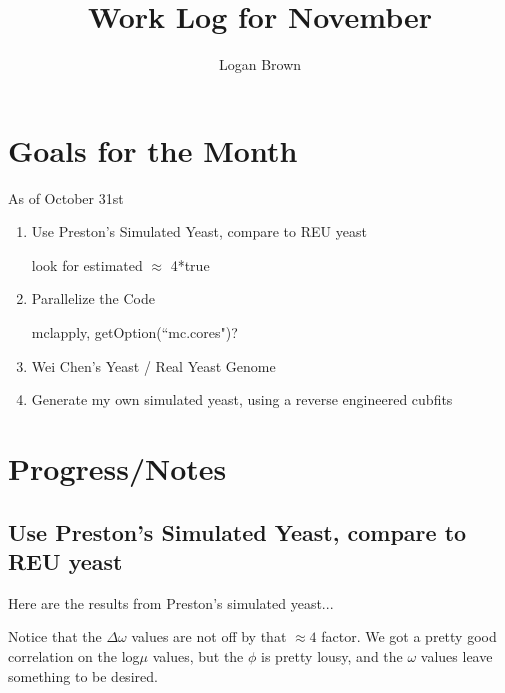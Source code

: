 

\title{Work Log for November}
\author{Logan Brown}


\maketitle
\tableofcontents

\newpage


\section{Goals for the Month}
As of October 31st
\begin{enumerate}
\item Use Preston's Simulated Yeast, compare to REU yeast

look for estimated $\approx$ 4*true
\item Parallelize the Code

mclapply, getOption(``mc.cores")?
\item Wei Chen's Yeast / Real Yeast Genome
\item Generate my own simulated yeast, using a reverse engineered cubfits
\end{enumerate}

\section{Progress/Notes}

\subsection{Use Preston's Simulated Yeast, compare to REU yeast}

Here are the results from Preston's simulated yeast...

Notice that the $\Delta\omega$ values are not off by that $\approx4$ factor. We got a pretty good correlation on the log$\mu$ values, but the $\phi$ is pretty lousy, and the $\omega$ values leave something to be desired.

%
%
%
%
%
%
%
%
%

